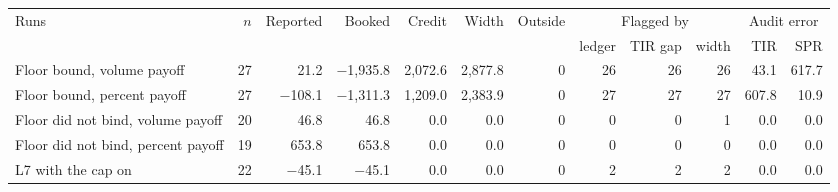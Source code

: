 \begin{tabular}{@{}lrrrrrrrrrrr@{}}
\toprule
Runs & $n$ & Reported & Booked & Credit & Width & Outside & \multicolumn{3}{c}{Flagged by} & \multicolumn{2}{c}{Audit error} \\
\cmidrule(lr){8-10}\cmidrule(l){11-12}
 & & & & & & & ledger & TIR gap & width & TIR & SPR \\
\midrule
Floor bound, volume payoff & 27 & 21.2 & $-$1{,}935.8 & 2{,}072.6 & 2{,}877.8 & 0 & 26 & 26 & 26 & 43.1 & 617.7 \\
Floor bound, percent payoff & 27 & $-$108.1 & $-$1{,}311.3 & 1{,}209.0 & 2{,}383.9 & 0 & 27 & 27 & 27 & 607.8 & 10.9 \\
Floor did not bind, volume payoff & 20 & 46.8 & 46.8 & 0.0 & 0.0 & 0 & 0 & 0 & 1 & 0.0 & 0.0 \\
Floor did not bind, percent payoff & 19 & 653.8 & 653.8 & 0.0 & 0.0 & 0 & 0 & 0 & 0 & 0.0 & 0.0 \\
L7 with the cap on & 22 & $-$45.1 & $-$45.1 & 0.0 & 0.0 & 0 & 2 & 2 & 2 & 0.0 & 0.0 \\
\bottomrule
\end{tabular}

